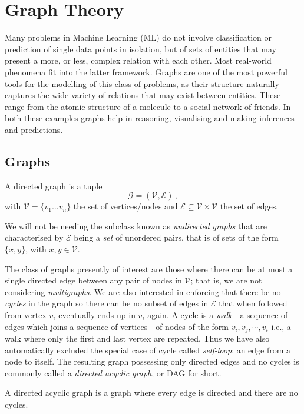 \section{Graph Theory} \label{sec:graph-theory}
Many problems in Machine Learning (ML) do not involve classification or prediction of single data points in isolation, but of sets of entities that may present a more, or less, complex relation with each other. 
Most real-world phenomena fit into the latter framework.
Graphs are one of the most powerful tools for the modelling of this class of problems, as their structure naturally captures the wide variety of relations that may exist between entities.
These range from the atomic structure of a molecule to a social network of friends.  
In both these examples graphs help in reasoning, visualising and making inferences and predictions.

\subsection{Graphs} \label{subsec:graphs}
\begin{definition}
	A directed graph is a tuple 
	\begin{equation*}
		\mathcal{G} = (\mathcal{V}, \mathcal{E}) \,,
	\end{equation*}
with $\mathcal{V} = \{ v_1 \ldots v_n \}$ the set of vertices/nodes and $\mathcal{E}\subseteq \mathcal{V} \times \mathcal{V}$ the set of edges.
\end{definition}
We will not be needing the subclass known as \textit{undirected graphs} that are characterised by $\mathcal{E}$ being a \textit{set} of unordered pairs, that is of sets of the form $\{x,y\}$, with $x,y \in \mathcal{V}$.

The class of graphs presently of interest are those where there can be at most a single directed edge between any pair of nodes in $\mathcal{V}$; that is, we are not considering \textit{multigraphs}.
We are also interested in enforcing that there be no \textit{cycles} in the graph so there can be no subset of edges in $\mathcal{E}$ that when followed from vertex $v_i$ eventually ends up in $v_i$ again.
A cycle is a \textit{walk} - a sequence of edges which joins a sequence of vertices - of nodes of the form $v_i, v_j, \cdots, v_i$ i.e., a walk where only the first and last vertex are repeated.
Thus we have also automatically excluded the special case of cycle called \textit{self-loop}: an edge from a node to itself. 
The resulting graph possessing only directed edges and no cycles is commonly called a \textit{directed acyclic graph}, or DAG for short.  
\begin{definition} \label{def:dag}
	A directed acyclic graph is a graph where every edge is directed and there are no cycles.
\end{definition}

